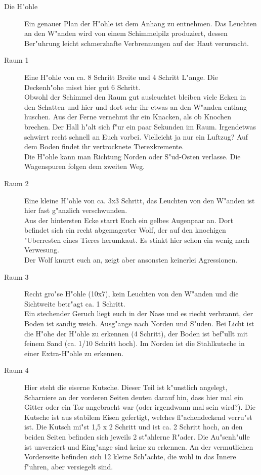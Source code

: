 \begin{description}
\item [Die H"ohle] Ein genauer Plan der H"ohle ist dem Anhang zu entnehmen. Das Leuchten an den W"anden wird von einem Schimmelpilz produziert, dessen Ber"uhrung leicht schmerzhafte Verbrennungen auf der Haut verursacht.

\item [Raum 1] Eine H"ohle von ca. 8 Schritt Breite und 4 Schritt L"ange. Die Deckenh"ohe misst hier gut 6 Schritt.\\
Obwohl der Schimmel den Raum gut ausleuchtet bleiben viele Ecken in den Schatten und hier und dort sehr ihr etwas an den W"anden entlang huschen. Aus der Ferne vernehmt ihr ein Knacken, als ob Knochen brechen. Der Hall h"alt sich f"ur ein paar Sekunden im Raum. Irgendetwas schwirrt recht schnell an Euch vorbei. Vielleicht ja nur ein Luftzug? Auf dem Boden findet ihr vertrocknete Tierexkremente.\\
Die H"ohle kann man Richtung Norden oder S"ud-Osten verlasse. Die Wagenspuren folgen dem zweiten Weg.

\item [Raum 2] Eine kleine H"ohle von ca. 3x3 Schritt, das Leuchten von den W"anden ist hier fast g"anzlich verschwunden.\\ Aus der hintersten Ecke starrt Euch ein gelbes Augenpaar an. Dort befindet sich ein recht abgemagerter Wolf, der auf den knochigen "Uberresten eines Tieres herumkaut. Es stinkt hier schon ein wenig nach Verwesung.\\
Der Wolf knurrt euch an, zeigt aber ansonsten keinerlei Agressionen.

\item [Raum 3] Recht gro"se H"ohle (10x7), kein Leuchten von den W"anden und die Sichtweite betr"agt ca. 1 Schritt.\\
Ein stechender Geruch liegt euch in der Nase und es riecht verbrannt, der Boden ist sandig weich. Ausg"ange nach Norden und S"uden. Bei Licht ist die H"ohe der H"ohle zu erkennen (4 Schritt), der Boden ist bef"ullt mit feinem Sand (ca. 1/10 Schritt hoch). Im Norden ist die Stahlkutsche in einer Extra-H"ohle zu erkennen.

\item [Raum 4] Hier steht die eiserne Kutsche. Dieser Teil ist k"unstlich angelegt, Scharniere an der vorderen Seiten deuten darauf hin, dass hier mal ein Gitter oder ein Tor angebracht war (oder irgendwann mal sein wird?). Die Kutsche ist aus stabilem Eisen gefertigt, welches fl"achendeckend verru"st ist. Die Kutsch mi"st 1,5 x 2 Schritt und ist ca. 2 Schritt hoch, an den beiden Seiten befinden sich jeweils 2 st"ahlerne R"ader. Die Au"senh"ulle ist unverziert und Eing"ange sind keine zu erkennen. An der vermutlichen Vorderseite befinden sich 12 kleine Sch"achte, die wohl in das Innere f"uhren, aber versiegelt sind.


\end{description}
